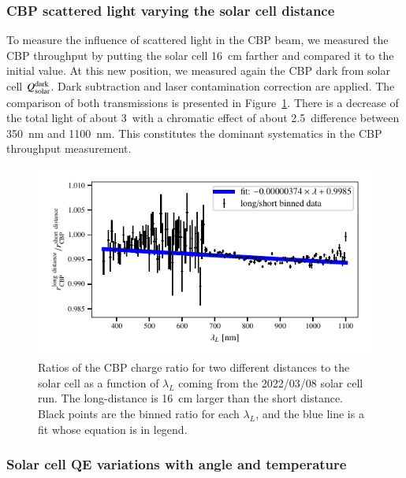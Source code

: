 \subsubsection{CBP scattered light varying the solar cell distance}

To measure the influence of scattered light in the CBP beam, we measured the CBP throughput by putting the solar cell \SI{16}{\cm} farther and compared it to the initial value. At this new position, we measured again the CBP dark from solar cell $Q_{\mathrm{solar}}^{\rm dark}$. Dark subtraction and laser contamination correction are applied. The comparison of both transmissions is presented in Figure~\ref{fig:sc_distance}. There is a decrease of the total light of about 3\textperthousand\ with a chromatic effect of about 2.5\textperthousand\ difference between \SI{350}{\nano\meter} and \SI{1100}{\nano\meter}. This constitutes the dominant systematics in the CBP throughput measurement.

\begin{figure}[h]
    \centering
    \includegraphics[width=\columnwidth]{fig/sc_distance.pdf}
    \caption{Ratios of the CBP charge ratio for two different distances to the solar cell as a function of $\lambda_L$ coming from the 2022/03/08 solar cell run. The long-distance is \SI{16}{\cm} larger than the short distance. Black points are the binned ratio for each $\lambda_L$, and the blue line is a fit whose equation is in legend.}
    \label{fig:sc_distance}
\end{figure}

\subsubsection{Solar cell QE variations with angle and temperature}

